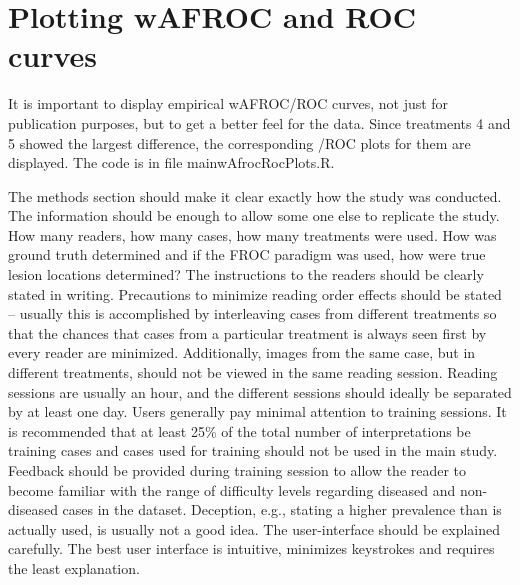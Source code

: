 \documentclass[
]{book}
\begin{document}
\hypertarget{froc-sample-size-plotting}{%
\section{Plotting wAFROC and ROC curves}\label{froc-sample-size-plotting}}

It is important to display empirical wAFROC/ROC curves, not just for publication purposes, but to get a better feel for the data. Since treatments 4 and 5 showed the largest difference, the corresponding /ROC plots for them are displayed. The code is in file mainwAfrocRocPlots.R.

The methods section should make it clear exactly how the study was conducted. The information should be enough to allow some one else to replicate the study. How many readers, how many cases, how many treatments were used. How was ground truth determined and if the FROC paradigm was used, how were true lesion locations determined? The instructions to the readers should be clearly stated in writing. Precautions to minimize reading order effects should be stated -- usually this is accomplished by interleaving cases from different treatments so that the chances that cases from a particular treatment is always seen first by every reader are minimized. Additionally, images from the same case, but in different treatments, should not be viewed in the same reading session. Reading sessions are usually an hour, and the different sessions should ideally be separated by at least one day. Users generally pay minimal attention to training sessions. It is recommended that at least 25\% of the total number of interpretations be training cases and cases used for training should not be used in the main study. Feedback should be provided during training session to allow the reader to become familiar with the range of difficulty levels regarding diseased and non-diseased cases in the dataset. Deception, e.g., stating a higher prevalence than is actually used, is usually not a good idea. The user-interface should be explained carefully. The best user interface is intuitive, minimizes keystrokes and requires the least explanation.
\end{document}
